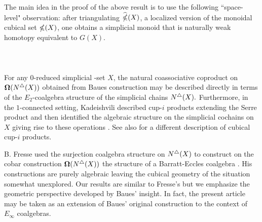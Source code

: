 
The main idea in the proof of the above result is to use the following ``space-level" observation: after triangulating $\widehat{\mathbb{\Omega}}({X})$, a localized version of the monoidal cubical set $\mathbb{\Omega}(X)$, one obtains a simplicial monoid that is naturally weak homotopy equivalent to $G(X).$ 
\\
\\
\\
\\
For any $0$-reduced simplicial -set $X$, the natural coassociative coproduct on $\operatorname{\mathbf{\Omega}} (N^{\triangle} (X))$ obtained from Baues construction may be described directly in terms of the $E_2$-coalgebra structure of the simplicial chains $N^{\triangle}(X).$ Furthermore, in the $1$-connected setting, Kadeishvili described cup-$i$ products extending the Serre product and then identified the algebraic structure on the simplicial cochains on $X$ giving rise to these operations \cite{kadeishvili1999coproducts, kadeishvili2003cup-i}.
See also \cite{pilarczyk2016cubical} for a different description of cubical cup-$i$ products.

B. Fresse used the surjection coalgebra structure on $N^{\triangle}(X)$ to construct on the cobar construction $\operatorname{\mathbf{\Omega}}(N^{\triangle}(X))$ the  structure of a Barratt-Eccles coalgebra \cite{fresse2003hopf}.
His constructions are purely algebraic leaving the cubical geometry of the situation somewhat unexplored.
Our results are similar to Fresse's but we emphasize the geometric perspective developed by Baues' insight.
In fact, the present article may be taken as an extension of Baues' original construction to the context of $E_{\infty}$ coalgebras.


